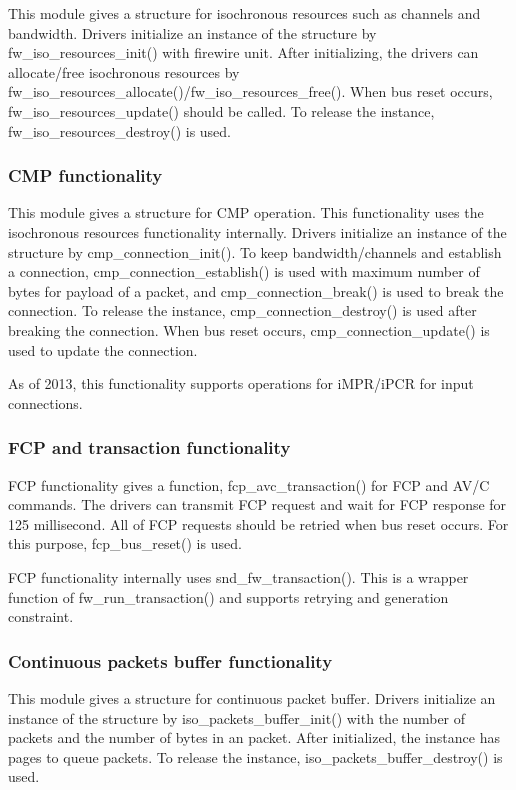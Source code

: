 \documentclass[onecolumn]{article}
\begin{document}
This module gives a structure for isochronous resources such as channels and bandwidth. Drivers initialize an instance of the structure by fw\_iso\_resources\_init() with firewire unit. After initializing, the drivers can allocate/free isochronous resources by fw\_iso\_resources\_allocate()/fw\_iso\_resources\_free(). When bus reset occurs, fw\_iso\_resources\_update() should be called. To release the instance, fw\_iso\_resources\_destroy() is used.

\subsubsection{CMP functionality}

This module gives a structure for CMP operation. This functionality uses the isochronous resources functionality internally. Drivers initialize an instance of the structure by cmp\_connection\_init(). To keep bandwidth/channels and establish a connection, cmp\_connection\_establish() is used with maximum number of bytes for payload of a packet, and cmp\_connection\_break() is used to break the connection. To release the instance, cmp\_connection\_destroy() is used after breaking the connection. When bus reset occurs, cmp\_connection\_update() is used to update the connection.

As of 2013, this functionality supports operations for iMPR/iPCR for input connections.

\subsubsection{FCP and transaction functionality}

FCP functionality gives a function, fcp\_avc\_transaction() for FCP and AV/C commands. The drivers can transmit FCP request and wait for FCP response for 125 millisecond. All of FCP requests should be retried when bus reset occurs. For this purpose, fcp\_bus\_reset() is used.

FCP functionality internally uses snd\_fw\_transaction(). This is a wrapper function of fw\_run\_transaction() and supports retrying and generation constraint.


\subsubsection{Continuous packets buffer functionality}

This module gives a structure for continuous packet buffer. Drivers initialize an instance of the structure by iso\_packets\_buffer\_init() with the number of packets and the number of bytes in an packet. After initialized, the instance has pages to queue packets. To release the instance, iso\_packets\_buffer\_destroy() is used.
\end{document}
